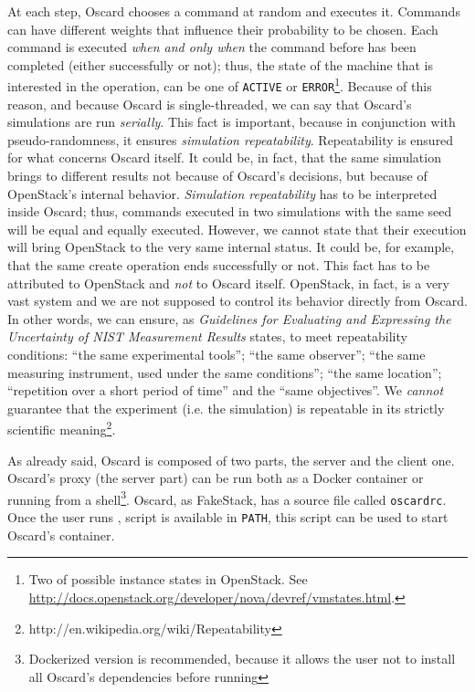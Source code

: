 At each step, Oscard chooses a command at random and executes it. Commands can have different weights that influence their probability to be chosen. Each command is executed \textit{when and only when} the command before has been completed (either successfully or not); thus, the state of the machine that is interested in the operation, can be one of \texttt{ACTIVE} or \texttt{ERROR}\footnote{Two of possible instance states in OpenStack. See \url{http://docs.openstack.org/developer/nova/devref/vmstates.html}.}. Because of this reason, and because Oscard is single-threaded, we can say that Oscard's simulations are run \textit{serially}. This fact is important, because in conjunction with pseudo-randomness, it ensures \textit{simulation repeatability}. Repeatability is ensured for what concerns Oscard itself. It could be, in fact, that the same simulation brings to different results not because of Oscard's decisions, but because of OpenStack's internal behavior. \emph{Simulation repeatability} has to be interpreted inside Oscard; thus, commands executed in two simulations with the same seed will be equal and equally executed. However, we cannot state that their execution will bring OpenStack to the very same internal status. It could be, for example, that the same create operation ends successfully or not. This fact has to be attributed to OpenStack and \emph{not} to Oscard itself. OpenStack, in fact, is a very vast system and we are not supposed to control its behavior directly from Oscard. In other words, we can ensure, as \textit{Guidelines for Evaluating and Expressing the Uncertainty of NIST Measurement Results} states, to meet repeatability conditions: ``the same experimental tools''; ``the same observer''; ``the same measuring instrument, used under the same conditions''; ``the same location''; ``repetition over a short period of time'' and the ``same objectives''. We \emph{cannot} guarantee that the experiment (i.e. the simulation) is repeatable in its strictly scientific meaning\footnote{http://en.wikipedia.org/wiki/Repeatability}.

As already said, Oscard is composed of two parts, the server and the client one. Oscard's proxy (the server part) can be run both as a Docker container or running  from a shell\footnote{Dockerized version is recommended, because it allows the user not to install all Oscard's dependencies before running}. Oscard, as FakeStack, has a source file called \texttt{oscardrc}. Once the user runs ,  script is available in \texttt{PATH}, this script can be used to start Oscard's container.

